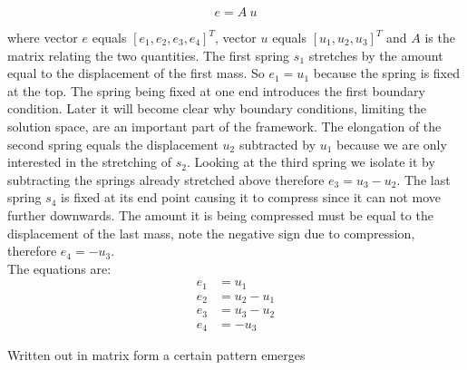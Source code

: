 \begin{equation}
\label{eq:e_related_to_u}
e = A \ u  
\end{equation}

where vector $e$ equals $[e_1, e_2, e_3, e_4]^T$, vector $u$ equals
$[u_1, u_2, u_3]^T$ and $A$ is the matrix relating the two quantities. 
The first spring $s_1$ stretches by the amount equal to the displacement of
the first mass. So $e_1 = u_1$ because the spring is fixed at
the top. The spring being fixed at one end introduces the first
boundary condition. Later it will become clear why 
boundary conditions, limiting the solution space, are an important
part of the framework. The elongation of the second spring
equals the displacement $u_2$ subtracted by $u_1$ because we are only interested in the stretching
of $s_2$. Looking at the third spring we isolate it by
subtracting the springs already stretched above therefore $e_3 = u_3 -
u_2$. The last spring $s_4$ is fixed at its end point causing it to
compress since it can not move further downwards. The amount it is
being compressed must be equal to the displacement of the last mass,
note the negative sign due to compression, therefore $e_4 = -u_3$. \\

The equations are:
\begin{align*}
e_1 &= u_1 \\
e_2 &= u_2 - u_1 \\
e_3 &= u_3 - u_2 \\
e_4 &= -u_3
\end{align*}


Written out in matrix form a certain pattern emerges

